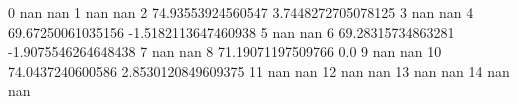0 nan nan
1 nan nan
2 74.93553924560547 3.7448272705078125
3 nan nan
4 69.67250061035156 -1.5182113647460938
5 nan nan
6 69.28315734863281 -1.9075546264648438
7 nan nan
8 71.19071197509766 0.0
9 nan nan
10 74.0437240600586 2.8530120849609375
11 nan nan
12 nan nan
13 nan nan
14 nan nan
